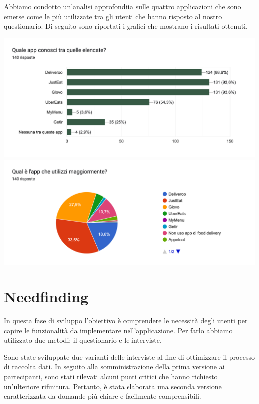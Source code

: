 \documentclass{article}
\begin{document}
\newpage
Abbiamo condotto un'analisi approfondita sulle quattro applicazioni che sono emerse come le più utilizzate tra gli utenti che hanno risposto al nostro questionario. Di seguito sono riportati i grafici che mostrano i risultati ottenuti.
\begin{center}
    \includegraphics[width=\textwidth]{Data/Grafici/App_competitor.png} 
    \includegraphics[width=\textwidth]{Data/Grafici/App_competitor_utilizzate.png}
\end{center}



\newpage
\section{Needfinding} 
In questa fase di sviluppo l’obiettivo è comprendere le necessità degli utenti per capire le funzionalità da implementare nell’applicazione. Per farlo abbiamo utilizzato due metodi: il questionario e le interviste.
    \vspace{1cm} \par
    \vspace{0.5cm}
        \par Sono state sviluppate due varianti delle interviste al fine di ottimizzare il processo di raccolta dati. In seguito alla somministrazione della prima versione ai partecipanti, sono stati rilevati alcuni punti critici che hanno richiesto un'ulteriore rifinitura. Pertanto, è stata elaborata una seconda versione caratterizzata da domande più chiare e facilmente comprensibili.
\end{document}

